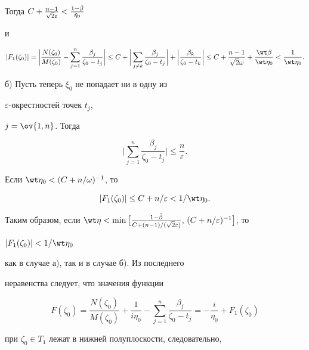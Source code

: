 Тогда $C+\frac{n-1}{\sqrt{2}\varepsilon}<


\frac{1-\Tilde\beta}{\Tilde\eta_0}$ 


и 


$$


|F_1(\zeta_0)|=\bigg|\frac{N(\zeta_0)}{M(\zeta_0)}-\sum^n_{j=1} 


\frac{\beta_j}{\zeta_0-t_j} \bigg|\le C+\bigg|\sum_{j\ne k} 


\frac{\beta_j}{\zeta_0-t_j} \bigg|+\bigg|\frac{\beta_k}{\zeta_0-t_k} 


\bigg| \le 


C+\frac{n-1}{\sqrt{2}\omega}+\frac{\wt\beta}{\wt\eta_0} 


<\frac{1}{\wt\eta_0}. 


$$


 


б) Пусть теперь $\xi_0$ не попадает ни в одну из 


$\varepsilon$-окрестностей точек $t_j$, 


$j=\ov{1,n}$. Тогда 


$$ 


\bigg|\sum^n_{j=1}\frac{\beta_j}{\zeta_0-t_j} \bigg| 


\le\frac{n}{\varepsilon}. 


$$ 


Если $\wt\eta_0<(C+n/\omega)^{-1}$, то 


$$ 


|F_1(\zeta_0)|\le C+n/\varepsilon <1/\wt\eta_0. 


$$ 


 


Таким образом, если $\wt\eta<\min\big[\frac{1-\Tilde\beta} 


{C+(n-1)/(\sqrt{2}\varepsilon)},\,(C+n/\varepsilon)^{-1}\big]$, то 


$|F_1(\zeta_0)|<1/\wt\eta_0$ 


как в случае а), так и в случае б). Из последнего 


неравенства следует, что значения функции 


$$ 


F(\zeta_0)=\frac{N(\zeta_0)}{M(\zeta_0)}+\frac{1}{i\eta_0} 


-\sum^n_{j=1}\frac{\beta_j}{\zeta_0-t_j} 


=-\frac{i}{\eta_0}+F_1(\zeta_0) 


$$ 


при $\zeta_0\in T_1$ лежат в нижней полуплоскости, следовательно, 


